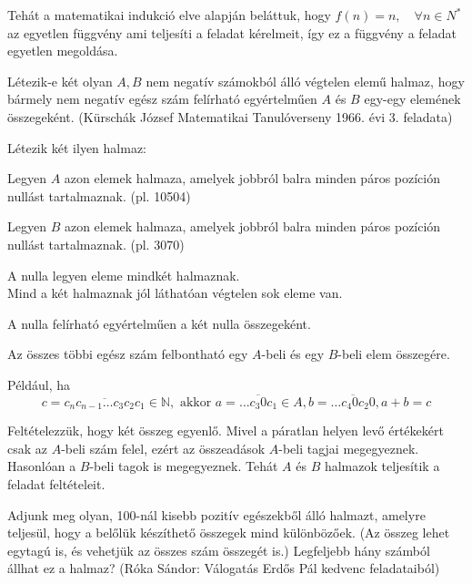 \begin{solution}
	Tehát a matematikai indukció elve alapján beláttuk, hogy $f(n)=n,\quad\forall n\in N^{*}$
	az egyetlen függvény ami teljesíti a feladat kérelmeit, így ez a függvény
	a feladat egyetlen megoldása. 
\end{solution}
\begin{extraproblem}
	Létezik-e két olyan $A,B$ nem negatív számokból álló végtelen elemű
	halmaz, hogy bármely nem negatív egész szám felírható egyértelműen
	$A$ és $B$ egy-egy elemének összegeként. (Kürschák József Matematikai
	Tanulóverseny 1966. évi 3. feladata)
\end{extraproblem}
\begin{solution}
	Létezik két ilyen halmaz:
	
	Legyen $A$ azon elemek halmaza, amelyek jobbról balra minden páros
	pozíción nullást tartalmaznak. (pl. 10504)
	
	Legyen $B$ azon elemek halmaza, amelyek jobbról balra minden páros
	pozíción nullást tartalmaznak. (pl. 3070)
	
	A nulla legyen eleme mindkét halmaznak.\\
	
	Mind a két halmaznak jól láthatóan végtelen sok eleme van.
	
	A nulla felírható egyértelműen a két nulla összegeként.
	
	Az összes többi egész szám felbontható egy $A$-beli és egy $B$-beli
	elem összegére.
	
	Például, ha 
	\[
	c=\overline{c_{n}c_{n-1}\dots c_{3}c_{2}c_{1}}\in\mathbb{N},\text{ akkor }a=\overline{\dots c_{3}0c_{1}}\in A,b=\overline{\dots c_{4}0c_{2}0},a+b=c
	\]
	
	Feltételezzük, hogy két összeg egyenlő. Mivel a páratlan helyen levő
	értékekért csak az $A$-beli szám felel, ezért az összeadások $A$-beli
	tagjai megegyeznek. Hasonlóan a $B$-beli tagok is megegyeznek. Tehát
	$A$ és $B$ halmazok teljesítik a feladat feltételeit.
\end{solution}
\begin{extraproblem}
	Adjunk meg olyan, 100-nál kisebb pozitív egészekből álló halmazt,
	amelyre teljesül, hogy a belőlük készíthető összegek mind különbözőek.
	(Az összeg lehet egytagú is, és vehetjük az összes szám összegét is.)
	Legfeljebb hány számból állhat ez a halmaz? (Róka Sándor: Válogatás
	Erdős Pál kedvenc feladataiból) 
\end{extraproblem}
